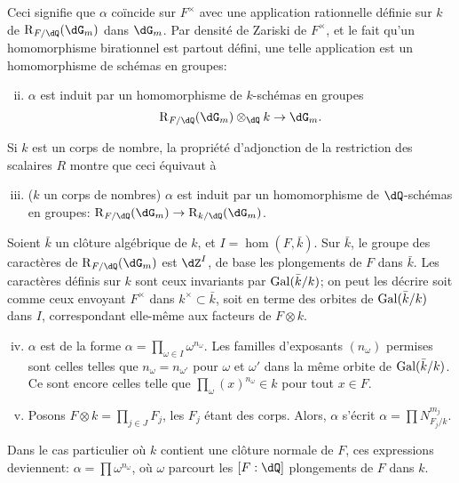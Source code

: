 Ceci signifie que $\alpha$ coïncide sur $F^\times$ avec une application 
rationnelle d\'efinie sur $k$ de $\res_{F/\dQ}(\dG_m)$ dans $\dG_m$. Par 
densit\'e de Zariski de $F^\times$, et le fait qu'un homomorphisme birationnel 
est partout d\'efini, une telle application est un homomorphisme de sch\'emas 
en groupes: 
\begin{enumerate}[(i)]
\setcounter{enumi}{1}
  \item $\alpha$ est induit par un homomorphisme de $k$-sch\'emas en groupes 
    \[
      \res_{F/\dQ}(\dG_m)\otimes_\dQ k \to \dG_m \text{.} 
    \] 
\end{enumerate}

Si $k$ est un corps de nombre, la propri\'et\'e d'adjonction de la restriction 
des scalaires $R$ montre que ceci \'equivaut \`a 
\begin{enumerate}[(i)]
\setcounter{enumi}{2}
  \item ($k$ un corps de nombres) $\alpha$ est induit par un homomorphisme de 
    $\dQ$-sch\'emas en groupes: $\res_{F/\dQ}(\dG_m) \to \res_{k/\dQ}(\dG_m)$. 
\end{enumerate}

Soient $\bar k$ un cl\^oture alg\'ebrique de $k$, et $I=\hom(F,\bar k)$. Sur 
$\bar k$, le groupe des caract\`eres de $\res_{F/\dQ}(\dG_m)$ est $\dZ^I$, de 
base les plongements de $F$ dans $\bar k$. Les caract\`eres d\'efinis sur $k$ 
sont ceux invariants par $\operatorname{Gal}(\bar k/k)$; on peut les d\'ecrire soit comme 
ceux envoyant $F^\times$ dans $k^\times\subset \bar k$, soit en terme des 
orbites de $\operatorname{Gal}(\bar k/k)$ dans $I$, correspondant elle-m\^eme aux facteurs de 
$F\otimes k$. 
\begin{enumerate}[(i)]
\setcounter{enumi}{3}
  \item $\alpha$ est de la forme 
    $\alpha=\prod_{\omega\in I} \omega^{n_\omega}$. Les familles d'exposants 
    $(n_\omega)$ permises sont celles telles que $n_\omega=n_{\omega'}$ pour 
    $\omega$ et $\omega'$ dans la m\^eme orbite de $\operatorname{Gal}(\bar k/k)$. Ce sont 
    encore celles telle que $\prod_\omega (x)^{n_\omega}\in k$ pour tout 
    $x\in F$. 
  \item Posons $F\otimes k=\prod_{j\in J} F_j$, les $F_j$ \'etant des corps. 
    Alors, $\alpha$ s'\'ecrit $\alpha=\prod N_{F_j/k}^{m_j}$. 
\end{enumerate}

Dans le cas particulier o\`u $k$ contient une cl\^oture normale de $F$, ces 
expressions deviennent: $\alpha=\prod \omega^{n_\omega}$, o\`u $\omega$ 
parcourt les $[F:\dQ]$ plongements de $F$ dans $k$. 





